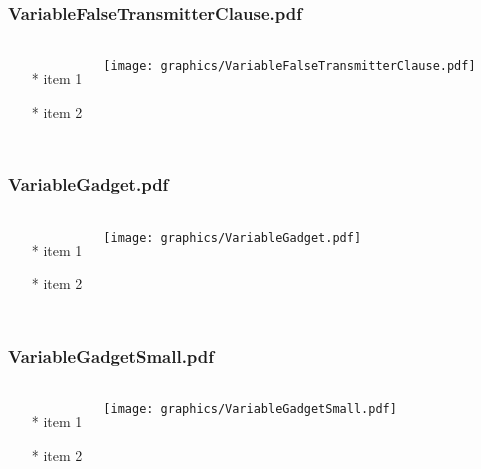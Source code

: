 \begin{frame} \frametitle{VariableFalseTransmitterClause.pdf}
    \begin{columns}[c]
        \begin{itemize}
            \item[*] item 1
            \item[*] item 2
        \end{itemize}
        \begin{minipage}{\linewidth}
            \begin{center}
            \texttt{[image: graphics/VariableFalseTransmitterClause.pdf]}
            \label{gfx:VariableFalseTransmitterClause.pdf}
            \end{center}
        \end{minipage}
    \end{columns}
\end{frame}
\begin{frame} \frametitle{VariableGadget.pdf}
    \begin{columns}[c]
        \begin{itemize}
            \item[*] item 1
            \item[*] item 2
        \end{itemize}
        \begin{minipage}{\linewidth}
            \begin{center}
            \texttt{[image: graphics/VariableGadget.pdf]}
            \label{gfx:VariableGadget.pdf}
            \end{center}
        \end{minipage}
    \end{columns}
\end{frame}
\begin{frame} \frametitle{VariableGadgetSmall.pdf}
    \begin{columns}[c]
        \begin{itemize}
            \item[*] item 1
            \item[*] item 2
        \end{itemize}
        \begin{minipage}{\linewidth}
            \begin{center}
            \texttt{[image: graphics/VariableGadgetSmall.pdf]}
            \label{gfx:VariableGadgetSmall.pdf}
            \end{center}
        \end{minipage}
    \end{columns}
\end{frame}
